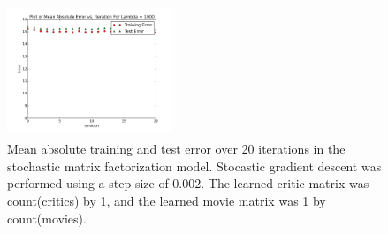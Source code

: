 \documentclass[10.5pt]{article}
\newcommand{\factwidth}{0.44}
\newcommand{\factheight}{1.6in}
\begin{document}
\begin{figure}[H]
\includegraphics[width=0\factwidth\textwidth,height=\factheight]{matrix_plots/test-i40d1l1000.png}
\caption{Mean absolute training and test error over 20 iterations in the stochastic matrix factorization model. Stocastic gradient descent was performed using a step size of 0.002. The learned critic matrix was count(critics) by 1, and the learned movie matrix was 1 by count(movies).}
\label{fig:fac-d1}
\end{figure}
\end{document}
